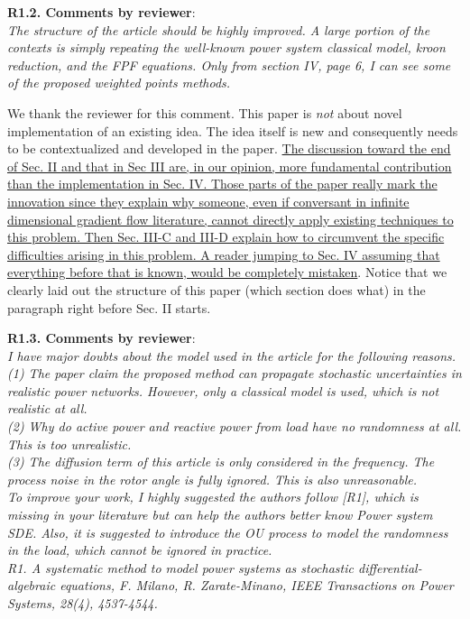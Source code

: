 \documentclass[12pt,onecolumn]{IEEEtran}
\newcommand{\blue}{\color{blue}}
\newcommand{\nib}{\noindent  {\bf Response:} }
\begin{document}
\noindent
{\bf R1.2. Comments by reviewer}:\\
{\em The structure of the article should be highly improved. A large portion of the contexts is simply repeating the well-known power system classical model, kroon reduction, and the FPF equations.  Only from section IV, page 6, I can see some of the proposed weighted points methods.}


{\nib{ \blue We thank the reviewer for this comment. This paper is \emph{not} about novel implementation of an existing idea. The idea itself is new and consequently needs to be contextualized and developed in the paper. \ul{The discussion toward the end of Sec. II and that in Sec III are, in our opinion, more fundamental contribution than the implementation in Sec. IV. Those parts of the paper really mark the innovation since they explain why someone, even if conversant in infinite dimensional gradient flow literature, cannot directly apply existing techniques to this problem. Then Sec. III-C and III-D explain how to circumvent the specific difficulties arising in this problem. A reader jumping to Sec. IV assuming that everything before that is known, would be completely mistaken}. Notice that we clearly laid out the structure of this paper (which section does what) in the paragraph right before Sec. II starts.}}


\noindent
{\bf R1.3. Comments by reviewer}:\\
{\em I have major doubts about the model used in the article for the following reasons.\\
(1)     The paper claim the proposed method can propagate stochastic uncertainties in realistic power networks. However, only a classical model is used, which is not realistic at all.\\
(2)     Why do active power and reactive power from load have no randomness at all. This is too unrealistic.\\
(3)     The diffusion term of this article is only considered in the frequency. The process noise in the rotor angle is fully ignored. This is also unreasonable.\\
To improve your work, I highly suggested the authors follow [R1], which is missing in your literature but can help the authors better know Power system SDE.  Also, it is suggested to introduce the OU process to model the randomness in the load, which cannot be ignored in practice.\\
R1. A systematic method to model power systems as stochastic differential-algebraic equations, F. Milano, R. Zarate-Minano, IEEE Transactions on Power Systems, 28(4), 4537-4544.}
\end{document}
